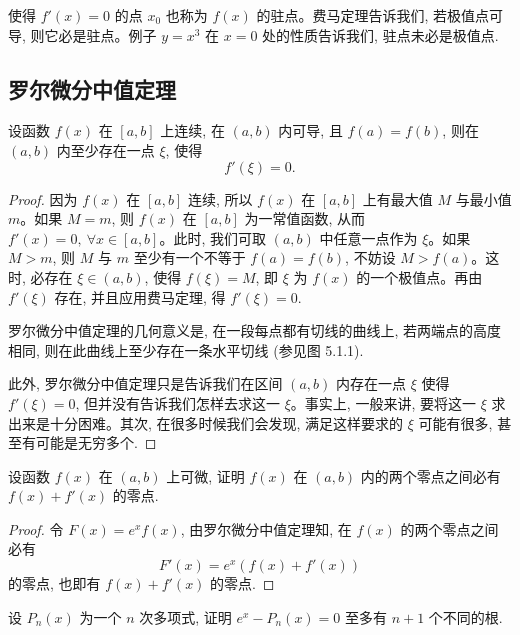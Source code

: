 \begin{remark}\label{remark:ma-5-source-4}
使得 $f'(x)=0$ 的点 $x_0$ 也称为 $f(x)$ 的驻点。费马定理告诉我们, 若极值点可导, 则它必是驻点。例子 $y=x^3$ 在 $x=0$ 处的性质告诉我们, 驻点未必是极值点.
\end{remark}


\subsection{罗尔微分中值定理}
\label{subsec:ma-5-1-2}

\begin{theorem}\label{theorem:ma-5-1-2}
设函数 $f(x)$ 在 $[a,b]$ 上连续, 在 $(a,b)$ 内可导, 且 $f(a)=f(b)$, 则在 $(a,b)$ 内至少存在一点 $\xi$, 使得
\[
  f'(\xi)=0.
\]
\end{theorem}


\begin{proof}
因为 $f(x)$ 在 $[a,b]$ 连续, 所以 $f(x)$ 在 $[a,b]$ 上有最大值 $M$ 与最小值 $m$。如果 $M=m$, 则 $f(x)$ 在 $[a,b]$ 为一常值函数, 从而 $f'(x)=0,\ \forall x\in[a,b]$。此时, 我们可取 $(a,b)$ 中任意一点作为 $\xi$。如果 $M>m$, 则 $M$ 与 $m$ 至少有一个不等于 $f(a)=f(b)$, 不妨设 $M>f(a)$。这时, 必存在 $\xi\in(a,b)$, 使得 $f(\xi)=M$, 即 $\xi$ 为 $f(x)$ 的一个极值点。再由 $f'(\xi)$ 存在, 并且应用费马定理, 得 $f'(\xi)=0$.

罗尔微分中值定理的几何意义是, 在一段每点都有切线的曲线上, 若两端点的高度相同, 则在此曲线上至少存在一条水平切线 (参见图 5.1.1).

此外, 罗尔微分中值定理只是告诉我们在区间 $(a,b)$ 内存在一点 $\xi$ 使得 $f'(\xi)=0$, 但并没有告诉我们怎样去求这一 $\xi$。事实上, 一般来讲, 要将这一 $\xi$ 求出来是十分困难。其次, 在很多时候我们会发现, 满足这样要求的 $\xi$ 可能有很多, 甚至有可能是无穷多个.
\end{proof}


\begin{example}\label{example:ma-5-1-1}
设函数 $f(x)$ 在 $(a,b)$ 上可微, 证明 $f(x)$ 在 $(a,b)$ 内的两个零点之间必有 $f(x)+f'(x)$ 的零点.
\end{example}


\begin{proof}
令 $F(x)=e^x f(x)$, 由罗尔微分中值定理知, 在 $f(x)$ 的两个零点之间必有
\[
  F'(x)=e^x(f(x)+f'(x))
\]
的零点, 也即有 $f(x)+f'(x)$ 的零点.
\end{proof}


\begin{example}\label{example:ma-5-1-2}
设 $P_n(x)$ 为一个 $n$ 次多项式, 证明 $e^x-P_n(x)=0$ 至多有 $n+1$ 个不同的根.
\end{example}


